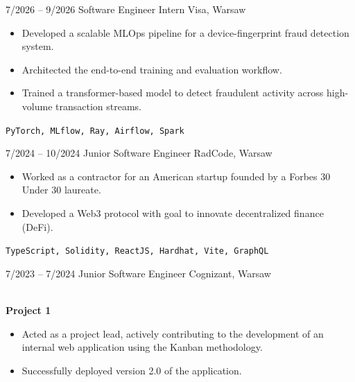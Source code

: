 \documentclass[8pt]{developercv} %
\begin{document}
\vspace{-20pt}
\begin{entrylist}
    \entry
        {7/2026 -- 9/2026}
		{Software Engineer Intern}
		{Visa, Warsaw}
		{
        \begin{itemize}[noitemsep,topsep=0pt,parsep=0pt,partopsep=0pt, leftmargin=-1pt]
            \item Developed a scalable MLOps pipeline for a device-fingerprint fraud detection system.
            \item Architected the end-to-end training and evaluation workflow.
            \item Trained a transformer-based model to detect fraudulent activity across high-volume transaction streams.
        \end{itemize}
        \vspace{2mm}
        \texttt{PyTorch, MLflow, Ray, Airflow, Spark}
        }
    \entry
        {7/2024 -- 10/2024}
		{Junior Software Engineer}
		{RadCode, Warsaw}
		{
        \begin{itemize}[noitemsep,topsep=0pt,parsep=0pt,partopsep=0pt, leftmargin=-1pt]
            \item Worked as a contractor for an American startup founded by a Forbes 30 Under 30 laureate.
            \item Developed a Web3 protocol with goal to innovate decentralized finance (DeFi).
        \end{itemize}
        \vspace{2mm}
        \texttt{TypeScript, Solidity, ReactJS, Hardhat, Vite, GraphQL}
        }
	\entry
        {7/2023 -- 7/2024}
		{Junior Software Engineer}
		{Cognizant, Warsaw}
		{\\
        \textbf{\small Project 1}\\
        \vspace{-10pt}
        \begin{itemize}[noitemsep,topsep=0pt,parsep=0pt,partopsep=0pt, leftmargin=-1pt]
            \item Acted as a project lead, actively contributing to the development of an internal web application using the Kanban methodology.
            \item Successfully deployed version 2.0 of the application.
        \end{itemize}
}
\end{entrylist}
\end{document}
